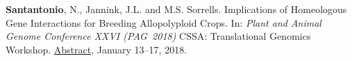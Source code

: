 \documentclass[10pt]{article}
\renewcommand{\section}[1]{\pagebreak[3]%
    \vspace{1.3\baselineskip}%
    \phantomsection\addcontentsline{toc}{section}{#1}%
    \noindent\llap{\scshape\smash{\parbox[t]{\marginparwidth}{\hyphenpenalty=10000\raggedright #1}}}%
    \vspace{-\baselineskip}\par}
\begin{document}
\begin{bibenum}
\item \textbf{Santantonio}, N., Jannink, J.L. and M.S. Sorrells.  Implications of Homeologous Gene Interactions for Breeding Allopolyploid Crops. In: \emph{Plant and Animal Genome Conference  XXVI (PAG~2018)} CSSA: Translational Genomics Workshop. \href{https://pag.confex.com/pag/xxvi/meetingapp.cgi/Paper/28461} {Abstract}, January 13--17, 2018.

\end{bibenum}

\vspace{0.1in}






\end{document}

